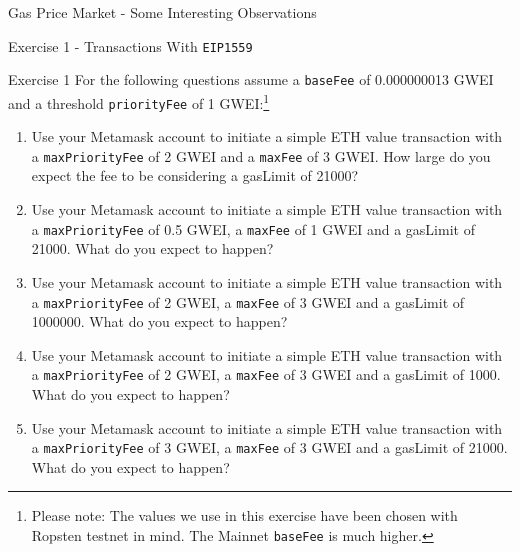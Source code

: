 \documentclass[handout]{beamer}
\begin{document}
\begin{frame}{Gas Price Market - Some Interesting Observations}
	\begin{center}
	\begin{tikzpicture}
		
	\end{tikzpicture}
	\end{center}
\end{frame}

\begin{frame}{Exercise 1 - Transactions With \texttt{EIP1559}} 
	\begin{exercise}{Exercise 1} 
	For the following questions assume a \texttt{baseFee}  of 0.000000013 GWEI and a threshold \texttt{priorityFee} of 1 GWEI:\footnote{Please note: The values we use in this exercise have been chosen with Ropsten testnet in mind. The Mainnet \texttt{baseFee} is much higher.}
	\begin{enumerate}[a]
		\item Use your Metamask account to initiate a simple ETH value transaction with a \texttt{maxPriorityFee} of 2 GWEI and a \texttt{maxFee} of 3 GWEI. How large do you expect the fee to be considering a gasLimit of 21000?
		\item Use your Metamask account to initiate a simple ETH value transaction with a \texttt{maxPriorityFee} of 0.5 GWEI, a \texttt{maxFee} of 1 GWEI and a gasLimit of 21000. What do you expect to happen?
		\item Use your Metamask account to initiate a simple ETH value transaction with a \texttt{maxPriorityFee} of 2 GWEI, a \texttt{maxFee} of 3 GWEI and a gasLimit of 1000000. What do you expect to happen?
		\item Use your Metamask account to initiate a simple ETH value transaction with a \texttt{maxPriorityFee} of 2 GWEI, a \texttt{maxFee} of 3 GWEI and a gasLimit of 1000. What do you expect to happen?
		\item Use your Metamask account to initiate a simple ETH value transaction with a \texttt{maxPriorityFee} of 3 GWEI, a \texttt{maxFee} of 3 GWEI and a gasLimit of 21000. What do you expect to happen?
	\end{enumerate}
	\end{exercise}
\end{frame}
\end{document}

